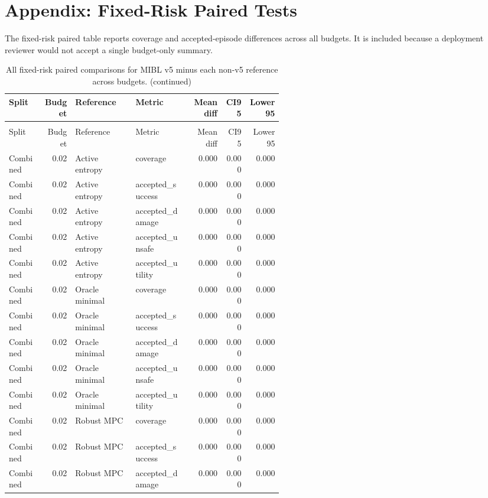 \documentclass{article}
\begin{document}
\section{Appendix: Fixed-Risk Paired Tests}
The fixed-risk paired table reports coverage and accepted-episode differences across all budgets. It is included because a deployment reviewer would not accept a single budget-only summary.
\begin{center}
\tiny
\begin{longtable}{p{0.13\linewidth}rp{0.22\linewidth}p{0.19\linewidth}rrr}
\caption{All fixed-risk paired comparisons for MIBL v5 minus each non-v5 reference across budgets.}\label{tab:fixed-pairwise}\\
\toprule
Split & Budget & Reference & Metric & Mean diff & CI95 & Lower95\\
\midrule
\endfirsthead
\caption[]{All fixed-risk paired comparisons for MIBL v5 minus each non-v5 reference across budgets. (continued)}\\
\toprule
Split & Budget & Reference & Metric & Mean diff & CI95 & Lower95\\
\midrule
\endhead
Combined & 0.02 & Active entropy & coverage & 0.000 & 0.000 & 0.000\\
Combined & 0.02 & Active entropy & accepted\_success & 0.000 & 0.000 & 0.000\\
Combined & 0.02 & Active entropy & accepted\_damage & 0.000 & 0.000 & 0.000\\
Combined & 0.02 & Active entropy & accepted\_unsafe & 0.000 & 0.000 & 0.000\\
Combined & 0.02 & Active entropy & accepted\_utility & 0.000 & 0.000 & 0.000\\
Combined & 0.02 & Oracle minimal & coverage & 0.000 & 0.000 & 0.000\\
Combined & 0.02 & Oracle minimal & accepted\_success & 0.000 & 0.000 & 0.000\\
Combined & 0.02 & Oracle minimal & accepted\_damage & 0.000 & 0.000 & 0.000\\
Combined & 0.02 & Oracle minimal & accepted\_unsafe & 0.000 & 0.000 & 0.000\\
Combined & 0.02 & Oracle minimal & accepted\_utility & 0.000 & 0.000 & 0.000\\
Combined & 0.02 & Robust MPC & coverage & 0.000 & 0.000 & 0.000\\
Combined & 0.02 & Robust MPC & accepted\_success & 0.000 & 0.000 & 0.000\\
Combined & 0.02 & Robust MPC & accepted\_damage & 0.000 & 0.000 & 0.000\\

\end{longtable}
\end{center}
\end{document}

